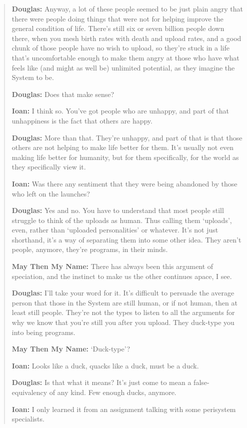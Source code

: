 \begin{quote}
\textbf{Douglas:} Anyway, a lot of these people seemed to be just plain angry that there were people doing things that were not for helping improve the general condition of life. There's still six or seven billion people down there, when you mesh birth rates with death and upload rates, and a good chunk of those people have no wish to upload, so they're stuck in a life that's uncomfortable enough to make them angry at those who have what feels like (and might as well be) unlimited potential, as they imagine the System to be.

\textbf{Douglas:} Does that make sense?

\textbf{Ioan:} I think so. You've got people who are unhappy, and part of that unhappiness is the fact that others are happy.

\textbf{Douglas:} More than that. They're unhappy, and part of that is that those others are not helping to make life better for them. It's usually not even making life better for humanity, but for them specifically, for the world as they specifically view it.

\textbf{Ioan:} Was there any sentiment that they were being abandoned by those who left on the launches?

\textbf{Douglas:} Yes and no. You have to understand that most people still struggle to think of the uploads as human. Thus calling them `uploads', even, rather than `uploaded personalities' or whatever. It's not just shorthand, it's a way of separating them into some other idea. They aren't people, anymore, they're programs, in their minds.

\textbf{May Then My Name:} There has always been this argument of speciation, and the instinct to make us the other continues apace, I see.

\textbf{Douglas:} I'll take your word for it. It's difficult to persuade the average person that those in the System are still human, or if not human, then at least still people. They're not the types to listen to all the arguments for why we know that you're still you after you upload. They duck-type you into being programs.

\textbf{May Then My Name:} `Duck-type'?

\textbf{Ioan:} Looks like a duck, quacks like a duck, must be a duck.

\textbf{Douglas:} Is that what it means? It's just come to mean a false-equivalency of any kind. Few enough ducks, anymore.

\textbf{Ioan:} I only learned it from an assignment talking with some perisystem specialists.


\end{quote}
